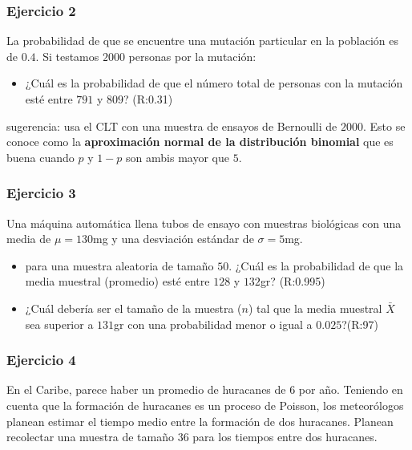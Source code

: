 \documentclass[
]{book}
\providecommand{\tightlist}{%
  \setlength{\itemsep}{0pt}\setlength{\parskip}{0pt}}
\begin{document}
\hypertarget{ejercicio-2-8}{%
\subsubsection{Ejercicio 2}\label{ejercicio-2-8}}

La probabilidad de que se encuentre una mutación particular en la población es de \(0.4\). Si testamos \(2000\) personas por la mutación:

\begin{itemize}
\tightlist
\item
  ¿Cuál es la probabilidad de que el número total de personas con la mutación esté entre \(791\) y \(809\)? (R:0.31)
\end{itemize}

sugerencia: usa el CLT con una muestra de ensayos de Bernoulli de \(2000\). Esto se conoce como la \textbf{aproximación normal de la distribución binomial} que es buena cuando \(p\) y \(1-p\) son ambis mayor que \(5\).

\hypertarget{ejercicio-3-5}{%
\subsubsection{Ejercicio 3}\label{ejercicio-3-5}}

Una máquina automática llena tubos de ensayo con muestras biológicas con una media de \(\mu=130\)mg y una desviación estándar de \(\sigma=5\)mg.

\begin{itemize}
\item
  para una muestra aleatoria de tamaño \(50\). ¿Cuál es la probabilidad de que
  la media muestral (promedio) esté entre \(128\) y \(132\)gr? (R:0.995)
\item
  ¿Cuál debería ser el tamaño de la muestra (\(n\)) tal que la media muestral \(\bar{X}\) sea superior a \(131\)gr con una probabilidad menor o igual a \(0.025\)?(R:97)
\end{itemize}

\hypertarget{ejercicio-4-3}{%
\subsubsection{Ejercicio 4}\label{ejercicio-4-3}}

En el Caribe, parece haber un promedio de huracanes de \(6\) por año. Teniendo en cuenta que la formación de huracanes es un proceso de Poisson, los meteorólogos planean estimar el tiempo medio entre la formación de dos huracanes. Planean recolectar una muestra de tamaño \(36\) para los tiempos entre dos huracanes.
\end{document}
